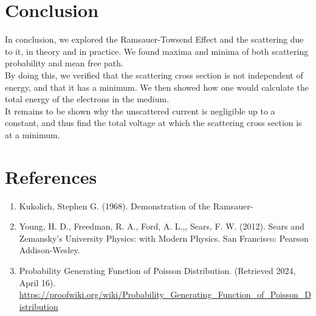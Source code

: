\documentclass{article}
\begin{document}
\section{Conclusion}
In conclusion, we explored the Ramsauer-Towsend Effect and the scattering due to it, in theory and in practice. We found maxima and minima of both scattering probability and mean free path. \\
\indent By doing this, we verified that the scattering cross section is not independent of energy, and that it has a minimum. We then showed how one would calculate the total energy of the electrons in the medium.\\
\indent It remains to be shown why the unscattered current is negligible up to a constant, and thus find the total voltage at which the scattering cross section is at a minimum.
\section{References}
\begin{enumerate}
\item Kukolich, Stephen G. (1968). Demonstration of the Ramsauer-
\item  Young, H. D., Freedman, R. A., Ford, A. L.,, Sears, F. W. (2012). Sears and Zemansky's University Physics: with Modern Physics. San Francisco: Pearson Addison-Wesley. 
\item Probability Generating Function of Poisson Distribution. (Retrieved 2024, April 16). \url{https://proofwiki.org/wiki/Probability_Generating_Function_of_Poisson_Distribution}
\end{enumerate}
\end{document}
